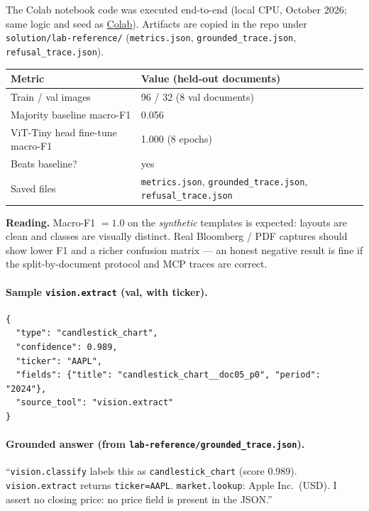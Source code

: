 \documentclass[11pt,a4paper]{article}
\begin{document}
The Colab notebook code was executed end-to-end (local CPU, October 2026; same
logic and seed as \href{https://colab.research.google.com/github/Amzil-AI/Vision-desk/blob/main/vision_desk_colab.ipynb}{Colab}).
Artifacts are copied in the repo under \texttt{solution/lab-reference/}
(\texttt{metrics.json}, \texttt{grounded\_trace.json}, \texttt{refusal\_trace.json}).

\begin{center}
\renewcommand{\arraystretch}{1.15}
\begin{tabular}{@{}p{4.2cm}p{10.4cm}@{}}
\toprule
\textbf{Metric} & \textbf{Value (held-out documents)} \\
\midrule
Train / val images & 96 / 32 (8 val documents) \\
Majority baseline macro-F1 & 0.056 \\
ViT-Tiny head fine-tune macro-F1 & 1.000 (8 epochs) \\
Beats baseline? & yes \\
Saved files & \texttt{metrics.json}, \texttt{grounded\_trace.json}, \texttt{refusal\_trace.json} \\
\bottomrule
\end{tabular}
\end{center}

{\color{warn}\textbf{Reading.}
Macro-F1 $=1.0$ on the \emph{synthetic} templates is expected: layouts are
clean and classes are visually distinct. Real Bloomberg / PDF captures should
show lower F1 and a richer confusion matrix --- an honest negative result is
fine if the split-by-document protocol and MCP traces are correct.}

\paragraph{Sample \texttt{vision.extract} (val, with ticker).}
\begin{verbatim}
{
  "type": "candlestick_chart",
  "confidence": 0.989,
  "ticker": "AAPL",
  "fields": {"title": "candlestick_chart__doc05_p0", "period": "2024"},
  "source_tool": "vision.extract"
}
\end{verbatim}

\paragraph{Grounded answer (from \texttt{lab-reference/grounded\_trace.json}).}
``\texttt{vision.classify} labels this as \texttt{candlestick\_chart} (score
0.989). \texttt{vision.extract} returns \texttt{ticker=AAPL}. \texttt{market.lookup}:
Apple Inc.\ (USD). I assert no closing price: no price field is present in the JSON.''
\end{document}
